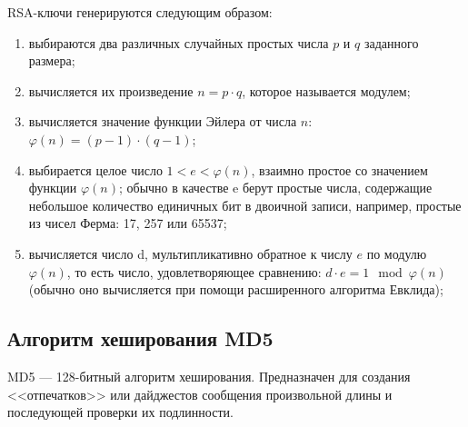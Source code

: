 RSA-ключи генерируются следующим образом:
\begin{enumerate}
    \item выбираются два различных случайных простых числа $p$ и $q$ заданного
          размера;
    \item вычисляется их произведение $n = p \cdot q$, которое называется модулем;
    \item вычисляется значение функции Эйлера от числа $n$:
          $\varphi(n) = (p-1) \cdot (q-1)$;
    \item выбирается целое число $1 < e <\varphi(n)$, взаимно простое
          со значением функции $\varphi(n)$; обычно в качестве e берут простые
          числа, содержащие небольшое количество единичных бит в двоичной
          записи, например, простые из чисел Ферма: 17, 257 или 65537;
    \item вычисляется число d, мультипликативно обратное к числу $e$ по модулю 
          $\varphi(n)$, то есть число, удовлетворяющее сравнению:
          $d \cdot e = 1 \mod {\varphi(n)}$ (обычно оно вычисляется при помощи
          расширенного алгоритма Евклида);
\end{enumerate}

\subsection{Алгоритм хеширования MD5}

MD5 --- 128-битный алгоритм хеширования. Предназначен для создания
<<отпечатков>> или дайджестов сообщения произвольной длины и последующей
проверки их подлинности.

